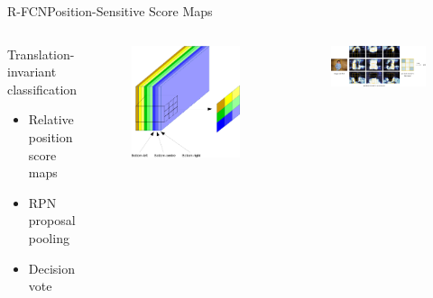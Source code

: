 \begin{frame}{R-FCN}{Position-Sensitive Score Maps}
\begin{columns}
        \begin{block}{Translation-invariant classification}
        \begin{itemize}
            \item Relative position score maps
            \item RPN proposal pooling
            \item Decision vote
        \end{itemize}
    \end{block}
        \begin{figure}
            \includegraphics[width=0.3 \textwidth]{figs/scoremaps.pdf}
        \end{figure}
        \begin{figure}
            \includegraphics[width=0.7 \textwidth]{figs/rfcnpooling.png}
        \end{figure}
    \end{columns}
\end{frame}

